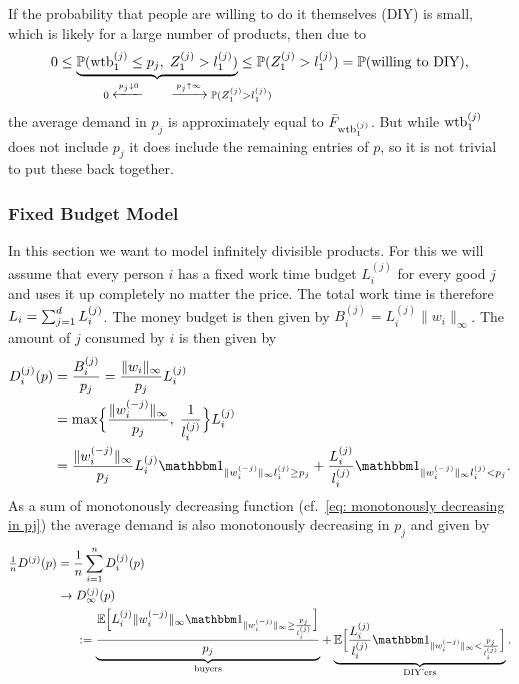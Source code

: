 If the probability that people are willing to do it themselves (DIY) is small,
which is likely for a large number of products, then due to
\[
	0
	\le \underbrace{\Pr(\wtb_1^{(j)} \le p_j,\; Z_1^{(j)} > l_1^{(j)})}_{
		0\; \xleftarrow{p_j\downarrow 0}
		\qquad \xrightarrow{p_j\uparrow\infty}\; \mathrlap{\Pr(Z_1^{(j)} > l_1^{(j)})}
	}
	\le \Pr(Z_1^{(j)} > l_1^{(j)}) = \Pr(\text{willing to DIY}),
\]
the average demand in \(p_j\) is approximately equal to
\(\bar{F}_{\operatorname{wtb}_1^{(j)}}\). But while \(\operatorname{wtb}_1^{(j)}\) does not include \(p_j\)
it does include the remaining entries of \(p\), so it is not trivial to put
these back together.

\subsubsection{Fixed Budget Model}

In this section we want to model infinitely divisible products. For this we will
assume that every person \(i\) has a fixed work time budget \(L_i^{(j)}\) for
every good \(j\) and uses it up completely no matter the price. The total
work time is therefore \(L_i = \sum_{j=1}^d L_i^{(j)}\).
The money budget is then given by \(B_i^{(j)} = L_i^{(j)}\|w_i\|_\infty\). The
amount of \(j\) consumed by \(i\) is then given by
\begin{align}
	\label{eq: fixed budget and consumption relation}
	D_i^{(j)}(p)
	&= \frac{B_i^{(j)}}{p_j} = \frac{\|w_i\|_\infty}{p_j}L_i^{(j)}\\
	\label{eq: monotonously decreasing in pj}
	&= \max\Bigl\{
		\frac{\|w_i^{(-j)}\|_\infty}{p_j},\;
		\frac1{l_i^{(j)}}
	\Bigr\}L_i^{(j)}\\
	\nonumber
	&= \frac{\|w_i^{(-j)}\|_\infty}{p_j}L_i^{(j)}
	\ind_{\|w_i^{(-j)}\|_\infty l_i^{(j)} \ge p_j}
	+ \frac{L_i^{(j)}}{l_i^{(j)}}
	\ind_{\|w_i^{(-j)}\|_\infty l_i^{(j)} < p_j}.
\end{align}
As a sum of monotonously decreasing function (cf.~\eqref{eq: monotonously
decreasing in pj}) the average demand is also monotonously decreasing in \(p_j\)
and given by
\begin{align*}
	\tfrac1n D^{(j)}(p)
	&= \frac1n \sum_{i=1}^n D_i^{(j)}(p)\\
	&\to\begin{aligned}[t]
		&D_\infty^{(j)}(p)\\
		&:= \underbrace{\frac{\E\Bigl[
			L_i^{(j)}\|w_i^{(-j)}\|_\infty 
			\ind_{\|w_i^{(-j)}\|_\infty \ge \frac{p_j}{l_i^{(j)}}}
		\Bigr]}{p_j}}_{
			\text{buyers}
		}
		+ \underbrace{\E\Bigl[
			\frac{L_i^{(j)}}{l_i^{(j)}}
			\ind_{\|w_i^{(-j)}\|_\infty  < \frac{p_j}{l_i^{(j)}}}
		\Bigr]}_{\text{DIY'ers}}.
	\end{aligned}
\end{align*}


